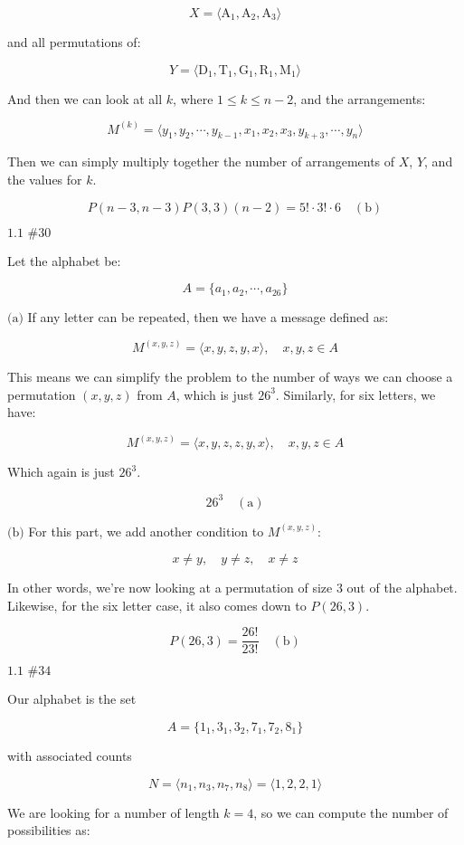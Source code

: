 \documentclass{article}
\newcommand{\problem}[2]{$\boxed{\text{#1 \##2}}$}
\newcommand{\subproblem}[1]{$\boxed{\text{(#1)}}$}
\newcommand{\subsolution}[2]{\boxed{#2\quad(\text{#1})}}
\begin{document}
\begin{multicols*}{2}
\[
X=\langle{}\text{A}_1,\text{A}_2,\text{A}_3\rangle
\]

and all permutations of:

\[
Y=\langle \text{D}_1,\text{T}_1,\text{G}_1,\text{R}_1,\text{M}_1\rangle
\]

And then we can look at all $k$, where $1\le{}k\le{}n-2$, and the
arrangements:

\[
M^{(k)}=\langle y_1,y_2,\cdots,y_{k-1},x_1,x_2,x_3,y_{k+3},\cdots,y_n\rangle
\]

Then we can simply multiply together the number of arrangements of
$X$, $Y$, and the values for $k$.

\[
\subsolution{b}{P(n-3,n-3)P(3,3)(n-2)=5!\cdot3!\cdot6}
\]

%
\problem{1.1}{30}

Let the alphabet be:

\[
A=\{a_1,a_2,\cdots,a_{26}\}
\]

%
\subproblem{a} If any letter can be repeated, then we have a message
defined as:

\[
M^{(x,y,z)}=\langle x,y,z,y,x \rangle,\quad x,y,z\in A
\]

This means we can simplify the problem to the number of ways we can
choose a permutation $(x,y,z)$ from $A$, which is just
$26^3$. Similarly, for six letters, we have:

\[
M^{(x,y,z)}=\langle x,y,z,z,y,x \rangle,\quad x,y,z\in A
\]

Which again is just $26^3$.

\[
\subsolution{a}{26^3}
\]

%
\subproblem{b} For this part, we add another condition to
$M^{(x,y,z)}$:

\[
x\ne y,\quad y\ne z,\quad x\ne z
\]

In other words, we're now looking at a permutation of size 3 out of
the alphabet. Likewise, for the six letter case, it also comes down to
$P(26,3)$.

\[
\subsolution{b}{P(26,3)=\frac{26!}{23!}}
\]

%
\problem{1.1}{34}

Our alphabet is the set

\[
A=\{1_1, 3_1, 3_2, 7_1, 7_2, 8_1\}
\]

with associated counts

\[
N=\langle n_1, n_3, n_7, n_8 \rangle = \langle 1, 2, 2, 1 \rangle
\]

We are looking for a number of length $k=4$, so we can compute the
number of possibilities as:


\end{multicols*}
\end{document}
